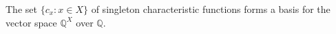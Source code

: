 The set $\{c_x : x \in X\}$ of singleton characteristic functions forms a basis for the vector space $\mathbb{Q}^X$ over $\mathbb{Q}$.
